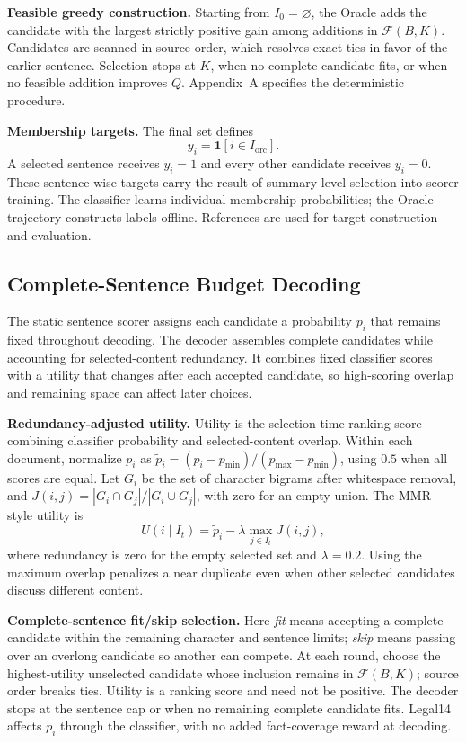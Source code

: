 \documentclass[10pt,twocolumn,letterpaper]{article}
\begin{document}
\textbf{Feasible greedy construction.} Starting from $I_0=\varnothing$, the Oracle adds the candidate with the largest strictly positive gain among additions in $\mathcal F(B,K)$. Candidates are scanned in source order, which resolves exact ties in favor of the earlier sentence. Selection stops at $K$, when no complete candidate fits, or when no feasible addition improves $Q$. Appendix~A specifies the deterministic procedure.

\textbf{Membership targets.} The final set defines
\begin{equation}
y_i=\mathbf1[i\in I_{\mathrm{orc}}].
\end{equation}
A selected sentence receives $y_i=1$ and every other candidate receives $y_i=0$. These sentence-wise targets carry the result of summary-level selection into scorer training. The classifier learns individual membership probabilities; the Oracle trajectory constructs labels offline. References are used for target construction and evaluation.

\subsection{Complete-Sentence Budget Decoding}\label{redundancy-and-complete-sentence-fitskip-decoding}
The static sentence scorer assigns each candidate a probability $p_i$ that remains fixed throughout decoding. The decoder assembles complete candidates while accounting for selected-content redundancy. It combines fixed classifier scores with a utility that changes after each accepted candidate, so high-scoring overlap and remaining space can affect later choices.

\textbf{Redundancy-adjusted utility.} Utility is the selection-time ranking score combining classifier probability and selected-content overlap. Within each document, normalize $p_i$ as $\widetilde p_i=(p_i-p_{\min})/(p_{\max}-p_{\min})$, using $0.5$ when all scores are equal. Let $G_i$ be the set of character bigrams after whitespace removal, and $J(i,j)=|G_i\cap G_j|/|G_i\cup G_j|$, with zero for an empty union. The MMR-style utility \citep{mmr1998} is
\begin{equation}
U(i\mid I_t)=\widetilde p_i-\lambda\max_{j\in I_t}J(i,j),
\end{equation}
where redundancy is zero for the empty selected set and $\lambda=0.2$. Using the maximum overlap penalizes a near duplicate even when other selected candidates discuss different content.

\textbf{Complete-sentence fit/skip selection.} Here \emph{fit} means accepting a complete candidate within the remaining character and sentence limits; \emph{skip} means passing over an overlong candidate so another can compete. At each round, choose the highest-utility unselected candidate whose inclusion remains in $\mathcal F(B,K)$; source order breaks ties. Utility is a ranking score and need not be positive. The decoder stops at the sentence cap or when no remaining complete candidate fits. Legal14 affects $p_i$ through the classifier, with no added fact-coverage reward at decoding.
\end{document}
